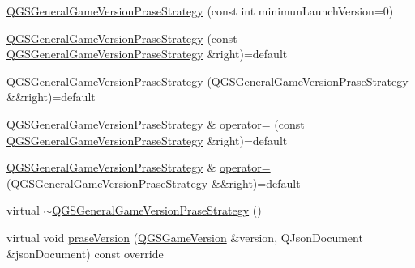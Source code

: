 \begin{DoxyCompactItemize}
\item 
\mbox{\hyperlink{class_q_g_s_general_game_version_prase_strategy_a01703c9d469170fac462e5387744be23}{Q\+G\+S\+General\+Game\+Version\+Prase\+Strategy}} (const int minimun\+Launch\+Version=0)
\item 
\mbox{\hyperlink{class_q_g_s_general_game_version_prase_strategy_ad748cac71b5c995e4422d8226342a708}{Q\+G\+S\+General\+Game\+Version\+Prase\+Strategy}} (const \mbox{\hyperlink{class_q_g_s_general_game_version_prase_strategy}{Q\+G\+S\+General\+Game\+Version\+Prase\+Strategy}} \&right)=default
\item 
\mbox{\hyperlink{class_q_g_s_general_game_version_prase_strategy_a7d6182f44e51dd1b5223082b7276cc04}{Q\+G\+S\+General\+Game\+Version\+Prase\+Strategy}} (\mbox{\hyperlink{class_q_g_s_general_game_version_prase_strategy}{Q\+G\+S\+General\+Game\+Version\+Prase\+Strategy}} \&\&right)=default
\item 
\mbox{\hyperlink{class_q_g_s_general_game_version_prase_strategy}{Q\+G\+S\+General\+Game\+Version\+Prase\+Strategy}} \& \mbox{\hyperlink{class_q_g_s_general_game_version_prase_strategy_a83e4589a8f771f8b2e8bded579190465}{operator=}} (const \mbox{\hyperlink{class_q_g_s_general_game_version_prase_strategy}{Q\+G\+S\+General\+Game\+Version\+Prase\+Strategy}} \&right)=default
\item 
\mbox{\hyperlink{class_q_g_s_general_game_version_prase_strategy}{Q\+G\+S\+General\+Game\+Version\+Prase\+Strategy}} \& \mbox{\hyperlink{class_q_g_s_general_game_version_prase_strategy_af8a020e08e7385f40cd2e51cfe8e56fc}{operator=}} (\mbox{\hyperlink{class_q_g_s_general_game_version_prase_strategy}{Q\+G\+S\+General\+Game\+Version\+Prase\+Strategy}} \&\&right)=default
\item 
virtual \mbox{\hyperlink{class_q_g_s_general_game_version_prase_strategy_a49a593fab635f5e8106fa43a65ab5976}{$\sim$\+Q\+G\+S\+General\+Game\+Version\+Prase\+Strategy}} ()
\item 
virtual void \mbox{\hyperlink{class_q_g_s_general_game_version_prase_strategy_a97b6266d0c89c224a8d70a9187c8bfca}{prase\+Version}} (\mbox{\hyperlink{class_q_g_s_game_version}{Q\+G\+S\+Game\+Version}} \&version, Q\+Json\+Document \&json\+Document) const override
\end{DoxyCompactItemize}
